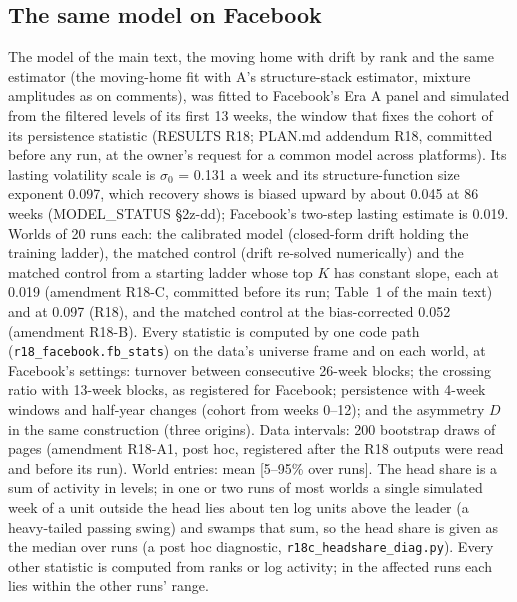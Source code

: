 \documentclass[10pt]{article}
\begin{document}
\subsection{The same model on Facebook}\label{sec:fbmodel}
The model of the main text, the moving home with drift by rank and the same estimator (the moving-home fit with A's structure-stack estimator, mixture amplitudes as on comments), was fitted to Facebook's Era A panel and simulated from the filtered levels of its first 13 weeks, the window that fixes the cohort of its persistence statistic (RESULTS R18; PLAN.md addendum R18, committed before any run, at the owner's request for a common model across platforms). Its lasting volatility scale is $\sigma_0$ = 0.131 a week and its structure-function size exponent 0.097, which recovery shows is biased upward by about 0.045 at 86 weeks (MODEL\_STATUS \S2z-dd); Facebook's two-step lasting estimate is 0.019. Worlds of 20 runs each: the calibrated model (closed-form drift holding the training ladder), the matched control (drift re-solved numerically) and the matched control from a starting ladder whose top $K$ has constant slope, each at 0.019 (amendment R18-C, committed before its run; Table~1 of the main text) and at 0.097 (R18), and the matched control at the bias-corrected 0.052 (amendment R18-B). Every statistic is computed by one code path (\texttt{r18\_facebook.fb\_stats}) on the data's universe frame and on each world, at Facebook's settings: turnover between consecutive 26-week blocks; the crossing ratio with 13-week blocks, as registered for Facebook; persistence with 4-week windows and half-year changes (cohort from weeks 0--12); and the asymmetry $D$ in the same construction (three origins). Data intervals: 200 bootstrap draws of pages (amendment R18-A1, post hoc, registered after the R18 outputs were read and before its run). World entries: mean [5--95\% over runs]. The head share is a sum of activity in levels; in one or two runs of most worlds a single simulated week of a unit outside the head lies about ten log units above the leader (a heavy-tailed passing swing) and swamps that sum, so the head share is given as the median over runs (a post hoc diagnostic, \texttt{r18c\_headshare\_diag.py}). Every other statistic is computed from ranks or log activity; in the affected runs each lies within the other runs' range.
\end{document}
